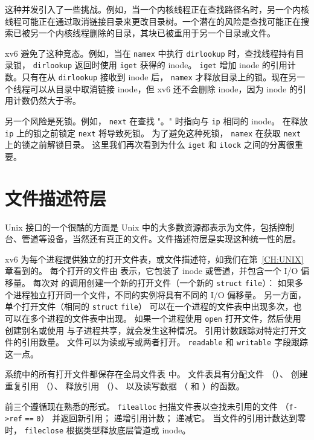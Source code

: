 这种并发引入了一些挑战。例如，当一个内核线程正在查找路径名时，另一个内核线程可能正在通过取消链接目录来更改目录树。一个潜在的风险是查找可能正在搜索已被另一个内核线程删除的目录，其块已被重用于另一个目录或文件。

xv6 避免了这种竞态。例如，当在
\lstinline{namex}
中执行
\lstinline{dirlookup}
时，查找线程持有目录锁，
\lstinline{dirlookup}
返回时使用
\lstinline{iget}
获得的 inode。
\lstinline{iget}
增加 inode 的引用计数。只有在从
\lstinline{dirlookup}
接收到 inode 后，
\lstinline{namex}
才释放目录上的锁。现在另一个线程可以从目录中取消链接 inode，但 xv6 还不会删除 inode，因为 inode 的引用计数仍然大于零。

另一个风险是死锁。例如，
\lstinline{next}
在查找 "。" 时指向与
\lstinline{ip}
相同的 inode。
在释放
\lstinline{ip}
上的锁之前锁定
\lstinline{next}
将导致死锁。
为了避免这种死锁，
\lstinline{namex}
在获取
\lstinline{next}
上的锁之前解锁目录。
这里我们再次看到为什么
\lstinline{iget}
和
\lstinline{ilock}
之间的分离很重要。
\section{文件描述符层}

Unix 接口的一个很酷的方面是 Unix 中的大多数资源都表示为文件，包括控制台、管道等设备，当然还有真正的文件。文件描述符层是实现这种统一性的层。

xv6 为每个进程提供独立的打开文件表，或文件描述符，如我们在第~\ref{CH:UNIX} 章看到的。
每个打开的文件由
表示，它包装了 inode 或管道，并包含一个 I/O 偏移量。
每次对
的调用创建一个新的打开文件（一个新的
\lstinline{struct}
\lstinline{file}）：
如果多个进程独立打开同一个文件，不同的实例将具有不同的 I/O 偏移量。
另一方面，单个打开文件（相同的
\lstinline{struct}
\lstinline{file}）
可以在一个进程的文件表中出现多次，也可以在多个进程的文件表中出现。
如果一个进程使用
\lstinline{open}
打开文件，然后使用
创建别名或使用
与子进程共享，就会发生这种情况。
引用计数跟踪对特定打开文件的引用数量。
文件可以为读或写或两者打开。
\lstinline{readable}
和
\lstinline{writable}
字段跟踪这一点。

系统中的所有打开文件都保存在全局文件表
中。
文件表具有分配文件
（）、
创建重复引用
（）、
释放引用
（）、
以及读写数据
（
和
）的函数。

前三个遵循现在熟悉的形式。
\lstinline{filealloc}
扫描文件表以查找未引用的文件
（\lstinline{f->ref}
\lstinline{==}
\lstinline{0}）
并返回新引用；
递增引用计数；
递减它。
当文件的引用计数达到零时，
\lstinline{fileclose}
根据类型释放底层管道或 inode。

